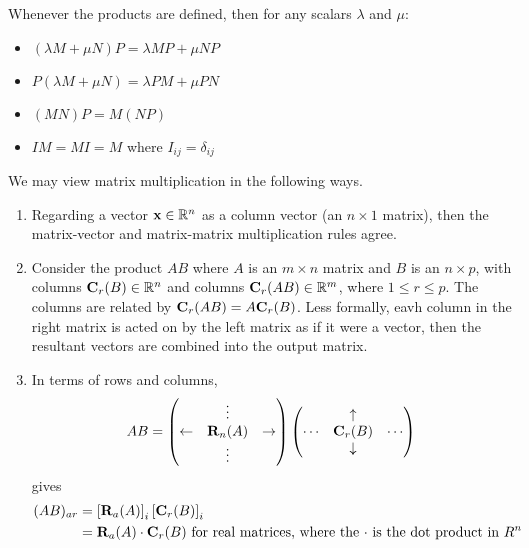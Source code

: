 Whenever the products are defined, then for any scalars \(\lambda\) and \(\mu\):
\begin{itemize}
	\item \((\lambda M + \mu N)P = \lambda MP + \mu NP\)
	\item \(P(\lambda M + \mu N) = \lambda PM + \mu PN\)
	\item \((MN)P = M(NP)\)
	\item \(IM = MI = M\) where \(I_{ij} = \delta_{ij}\)
\end{itemize}
We may view matrix multiplication in the following ways.
\begin{enumerate}
	\item Regarding a vector \(\vb x \in \mathbb R^n\) as a column vector (an \(n \times 1\) matrix), then the matrix-vector and matrix-matrix multiplication rules agree.
	\item Consider the product \(AB\) where \(A\) is an \(m \times n\) matrix and \(B\) is an \(n \times p\), with columns \(\vb C_r(B) \in \mathbb R^n\) and columns \(\vb C_r(AB) \in \mathbb R^m\), where \(1 \leq r \leq p\).
	      The columns are related by \(\vb C_r(AB) = A \vb C_r(B)\).
	      Less formally, eavh column in the right matrix is acted on by the left matrix as if it were a vector, then the resultant vectors are combined into the output matrix.
	\item In terms of rows and columns,
	      \[
		      AB = \begin{pmatrix}
			                 & \vdots     &             \\
			      \leftarrow & \vb R_n(A) & \rightarrow \\
			                 & \vdots     &
		      \end{pmatrix} \begin{pmatrix}
			             & \uparrow   &        \\
			      \cdots & \vb C_r(B) & \cdots \\
			             & \downarrow &
		      \end{pmatrix}
	      \]
	      gives
	      \begin{align*}
		      (AB)_{ar} & = \left[ \vb R_a(A) \right]_i \left[ \vb C_r(B) \right]_i                                                  \\
		                & = \vb R_a(A) \cdot \vb C_r(B) \text{ for real matrices, where the \(\cdot\) is the dot product in \(R^n\)}
	      \end{align*}
\end{enumerate}


